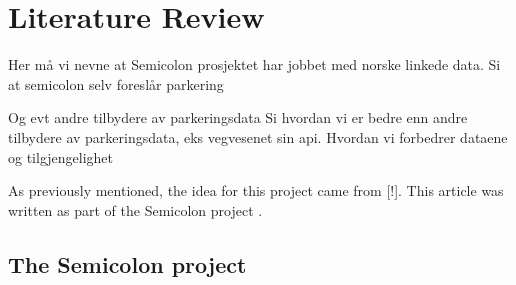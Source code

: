 \chapter{Literature Review}

Her må vi nevne at Semicolon prosjektet har jobbet med norske linkede data. 
Si at semicolon selv foreslår parkering

Og evt andre tilbydere av parkeringsdata
Si hvordan vi er bedre enn andre tilbydere av parkeringsdata, eks vegvesenet sin api. Hvordan vi forbedrer dataene og tilgjengelighet


As previously mentioned, the idea for this project came from [!]. This article was written as part of the Semicolon project \cite{semicolon}.


\section{The Semicolon project}
